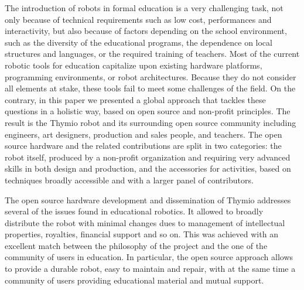 \documentclass[letterpaper, 10 pt, conference]{ieeeconf}  %
\begin{document}
The introduction of robots in formal education is a very challenging task, not only because of technical requirements such as low cost, performances and interactivity, but also because of factors depending on the school environment, such as the diversity of the educational programs, the dependence on local structures and languages, or the required training of teachers.
Most of the current robotic tools for education capitalize upon existing hardware platforms, programming environments, or robot architectures.
Because they do not consider all elements at stake, these tools fail to meet some challenges of the field.
On the contrary, in this paper we presented a global approach that tackles these questions in a holistic way, based on open source and non-profit principles.
The result is the Thymio robot and its surrounding open source community including engineers, art designers, production and sales people, and teachers.
The open source hardware and the related contributions are split in two categories: the robot itself, produced by a non-profit organization and requiring very advanced skills in both design and production, and the accessories for activities, based on techniques broadly accessible and with a larger panel of contributors.

The open source hardware development and dissemination of Thymio addresses several of the issues found in educational robotics.
It allowed to broadly distribute the robot with minimal changes dues to management of intellectual properties, royalties, financial support and so on.
This was achieved with an excellent match between the philosophy of the project and the one of the community of users in education.
In particular, the open source approach allows to provide a durable robot, easy to maintain and repair, with at the same time a community of users providing educational material and mutual support.
\end{document}

